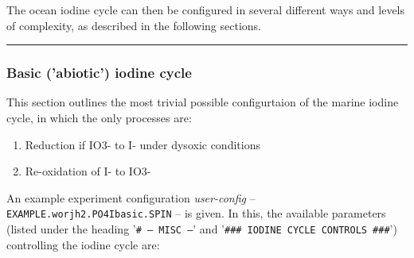 \documentclass[11pt,fleqn]{book} %
\begin{document}
The ocean iodine cycle can then be configured in several different ways and levels of complexity, as described in the following sections.

%
\noindent\rule{4cm}{0.5pt}
\subsubsection{Basic ('abiotic') iodine cycle}
\vspace{1mm}

This section outlines the most trivial possible configurtaion of the marine iodine cycle, in which the only processes are:
\begin{enumerate}[noitemsep]
\vspace{1mm}
\item Reduction if IO3- to I- under dysoxic conditions
\vspace{1mm}
\item Re-oxidation of I- to IO3-
\end{enumerate}
\vspace{1mm}

\noindent An example experiment configuration \textit{user-config} -- \texttt{EXAMPLE.worjh2.PO4Ibasic.SPIN} -- is given. In this, the available parameters (listed under the heading '\texttt{\# --- MISC ---}' and '\texttt{\#\#\# IODINE CYCLE CONTROLS \#\#\#}') controlling the iodine cycle are:
\end{document}
